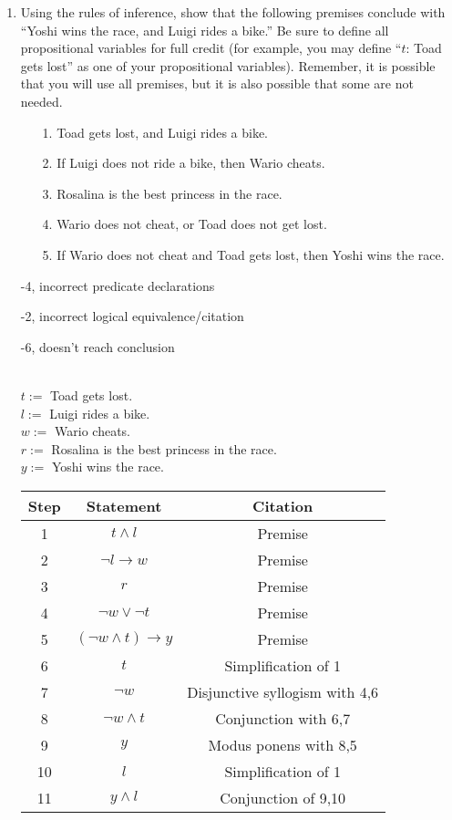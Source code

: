 \begin{enumerate}
\item Using the rules of inference, show that the following premises conclude with “Yoshi wins the race, and Luigi rides a bike.” Be sure to define all propositional variables for full credit (for example, you may define “$t$: Toad gets lost” as one of your propositional variables). Remember, it is possible that you will use all premises, but it is also possible that some are not needed. 

\begin{enumerate}
    \item[1.] Toad gets lost, and Luigi rides a bike.
    \item[2.] If Luigi does not ride a bike, then Wario cheats.
    \item[3.] Rosalina is the best princess in the race.
    \item[4.] Wario does not cheat, or Toad does not get lost.
    \item[5.] If Wario does not cheat and Toad gets lost, then Yoshi wins the race.
\end{enumerate}

\begin{rubric}
-4, incorrect predicate declarations

-2, incorrect logical equivalence/citation

-6, doesn't reach conclusion
\end{rubric}

\begin{solution}\\
$t :=$ Toad gets lost.\\
$l :=$ Luigi rides a bike.\\
$w :=$ Wario cheats.\\
$r :=$ Rosalina is the best princess in the race.\\
$y :=$ Yoshi wins the race.\\
\begin{center}
\begin{tabular}{c|c|c}
    Step & Statement & Citation\\
    \hline
    1 & $t \land l$ & Premise \\
    2 & $\neg l \rightarrow w$ & Premise \\
    3 & $r$ & Premise \\
    4 & $\neg w \lor \neg t$ & Premise \\
    5 & $(\neg w \land t) \rightarrow y$& Premise \\
    6 & $t$ & Simplification of 1 \\
    7 & $\neg w$ & Disjunctive syllogism with 4,6 \\
    8 & $\neg w \land t$ & Conjunction with 6,7 \\
    9 & $y$ & Modus ponens with 8,5 \\
    10 & $l$ & Simplification of 1 \\
    11 & $y \land l$ & Conjunction of 9,10
\end{tabular}
\end{center}
\end{solution}


\end{enumerate}
